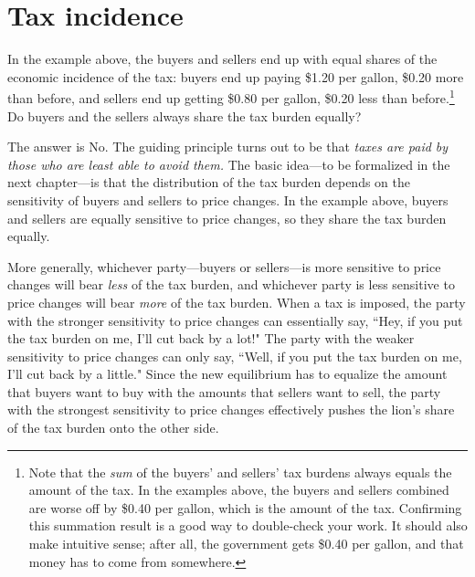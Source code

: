 \section{Tax incidence}

In the example above, the buyers and sellers end up with equal shares of the economic incidence of the tax: buyers end up paying \$1.20 per gallon, \$0.20 more than before, and sellers end up getting \$0.80 per gallon, \$0.20 less than before.\footnote{Note that the \emph{sum} of the buyers' and sellers' tax burdens always equals the amount of the tax. In the examples above, the buyers and sellers combined are worse off by \$0.40 per gallon, which is the amount of the tax. Confirming this summation result is a good way to double-check your work. It should also make intuitive sense; after all, the government gets \$0.40 per gallon, and that money has to come from somewhere.} Do buyers and the sellers always share the tax burden equally?


The answer is No. The guiding principle turns out to be that \emph{taxes are paid by those who are least able to avoid them.} The basic idea---to be formalized in the next chapter---is that the distribution of the tax burden depends on the sensitivity of buyers and sellers to price changes. In the example above, buyers and sellers are equally sensitive to price changes, so they share the tax burden equally.

More generally, whichever party---buyers or sellers---is more sensitive to price changes will bear \emph{less} of the tax burden, and whichever party is less sensitive to price changes will bear \emph{more} of the tax burden. When a tax is imposed, the party with the stronger sensitivity to price changes can essentially say, ``Hey, if you put the tax burden on me, I'll cut back by a lot!" The party with the weaker sensitivity to price changes can only say, ``Well, if you put the tax burden on me, I'll cut back by a little." Since the new equilibrium has to equalize the amount that buyers want to buy with the amounts that sellers want to sell, the party with the strongest sensitivity to price changes effectively pushes the lion's share of the tax burden onto the other side.

